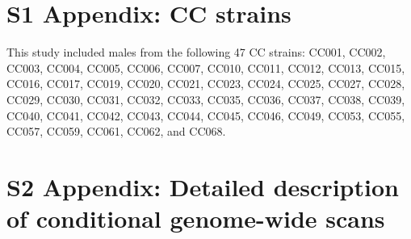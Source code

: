 \documentclass[10pt,letterpaper,twoside]{article}
\begin{document}
\thispagestyle{empty}
\newpage
\setcounter{page}{1}

\section*{S1 Appendix: CC strains}

This study included males from the following 47 CC strains: CC001, CC002, CC003, CC004, CC005, CC006, CC007, CC010, CC011, CC012, CC013, CC015, CC016, CC017, CC019, CC020, CC021, CC023, CC024, CC025, CC027, CC028, CC029, CC030, CC031, CC032, CC033, CC035, CC036, CC037, CC038, CC039, CC040, CC041, CC042, CC043, CC044, CC045, CC046, CC049, CC053, CC055, CC057, CC059, CC061, CC062, and CC068.

\newpage

\section*{S2 Appendix: Detailed description of conditional genome-wide scans}
\end{document}
